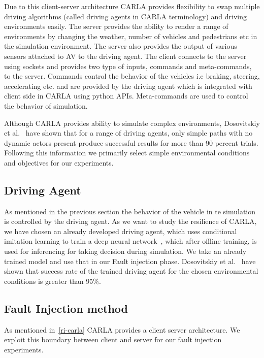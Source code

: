 \bigskip

Due to this client-server architecture CARLA provides flexibility to swap multiple driving algorithms (called driving agents in CARLA terminology) and driving environments easily. The server provides the ability to render a range of environments by changing the weather, number of vehicles and pedestrians etc in the simulation environment. The server also provides the output of various sensors attached to AV to the driving agent. The client connects to the server using sockets and provides two type of inputs, commands and meta-commands, to the server. Commands control the behavior of the vehicles i.e braking, steering, accelerating etc. and are provided by the driving agent which is integrated with client side in CARLA using python APIs. Meta-commands are used to control the behavior of simulation.

Although CARLA provides ability to simulate complex environments, Dosovitskiy et al.~\cite{Dosovitskiy17} have shown that for a range of driving agents, only simple paths with no dynamic actors present produce successful results for more than 90 percent trials. Following this information we primarily select simple environmental conditions and objectives for our experiments. 

\subsection{Driving Agent}
As mentioned in the previous section the behavior of the vehicle in te simulation is controlled by the driving agent. As we want to study the resilience of CARLA, we have chosen an already developed driving agent, which uses conditional imitation learning to train a deep neural network~\cite{Codevilla2018}, which after offline training, is used for inferencing for taking decision during simulation. We take an already trained model and use that in our Fault injection phase. Dosovitskiy et al.~\cite{Dosovitskiy17} have shown that success rate of the trained driving agent for the chosen environmental conditions is greater than 95\%.

\subsection{Fault Injection method} \label{method}
As mentioned in~\ref{ri-carla} CARLA provides a client server architecture. We exploit this boundary between client and server for our fault injection experiments. 

